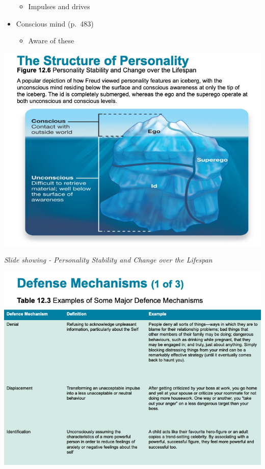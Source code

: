 \documentclass[
]{book}
\providecommand{\tightlist}{%
  \setlength{\itemsep}{0pt}\setlength{\parskip}{0pt}}
\begin{document}
\begin{reflect}
\begin{itemize}
  \begin{itemize}
  \tightlist
  \item
    Impulses and drives\\
  \end{itemize}
\item
  Conscious mind (p.~483)

  \begin{itemize}
  \tightlist
  \item
    Aware of these
  \end{itemize}
\end{itemize}

\includegraphics{assets/unit_5/slide_31.png}

\emph{Slide showing - Personality Stability and Change over the Lifespan}

\includegraphics{assets/unit_5/slide_32.png}


\end{reflect}
\end{document}
